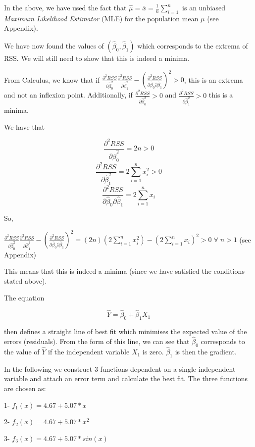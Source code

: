 \documentclass[11pt]{article}
\begin{document}
In the above, we have used the fact that
\(\hat{\mu} = \bar{x} = \frac{1}{n} \sum_{i=1}^n\) is an unbiased
\emph{Maximum Likelihood Estimator} (MLE) for the population mean
\(\mu\) (see Appendix).

We have now found the values of \((\hat{\beta}_0,\hat{\beta}_1)\) which
corresponds to the extrema of RSS. We will still need to show that this
is indeed a minima.

From Calculus, we know that if
\(\frac{\partial^2 RSS}{\partial \hat{\beta}_0 ^2} \frac{\partial^2 RSS}{\partial \hat{\beta}_1 ^2} - (\frac{\partial^2 RSS}{\partial \hat{\beta}_0 \partial \hat{\beta}_1})^2 > 0\),
this is an extrema and not an inflexion point. Additionally, if
\(\frac{\partial^2 RSS}{\partial \hat{\beta}_0 ^2} > 0\) and
\(\frac{\partial^2 RSS}{\partial \hat{\beta}_1 ^2} > 0\) this is a
minima.

We have that

\[\frac{\partial^2 RSS}{\partial \hat{\beta}_0 ^2} = 2n > 0\]
\[\frac{\partial^2 RSS}{\partial \hat{\beta}_1 ^2} = 2 \sum_{i=1}^n x_i^2 > 0\]
\[\frac{\partial^2 RSS}{\partial \hat{\beta}_0 \partial \hat{\beta}_1} = 2 \sum_{i=1}^n x_i\]

So,

\(\frac{\partial^2 RSS}{\partial \hat{\beta}_0 ^2} \frac{\partial^2 RSS}{\partial \hat{\beta}_1 ^2} - (\frac{\partial^2 RSS}{\partial \hat{\beta}_0 \partial \hat{\beta}_1})^2 = (2n) (2 \sum_{i=1}^n x_i^2) - (2 \sum_{i=1}^n x_i)^2 > 0 \; \forall \; n>1\)
(see Appendix)

This means that this is indeed a minima (since we have satisfied the
conditions stated above).

The equation

\[\hat{Y} = \hat{\beta}_0 + \hat{\beta}_1 X_1\]

then defines a straight line of best fit which minimises the expected
value of the errors (residuals). From the form of this line, we can see
that \(\hat{\beta}_0\) corresponds to the value of \(\hat{Y}\) if the
independent variable \(X_1\) is zero. \(\hat{\beta}_1\) is then the
gradient.

In the following we construct 3 functions dependent on a single
independent variable and attach an error term and calculate the best
fit. The three functions are chosen as:

1- \(f_1(x) = 4.67 + 5.07*x\)

2- \(f_2(x) = 4.67 + 5.07*x^2\)

3- \(f_3(x) = 4.67 + 5.07*sin(x)\)
\end{document}
